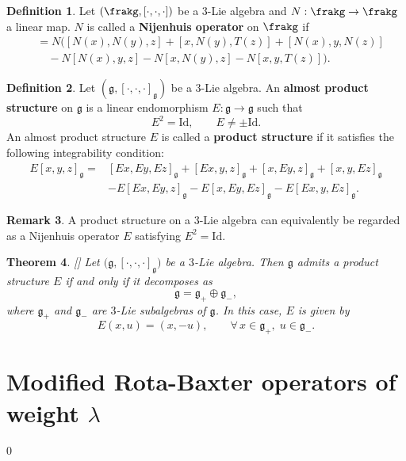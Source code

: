 \documentclass[12pt]{amsart}
\newtheorem{theorem}{Theorem}[section]
\theoremstyle{definition}
\newtheorem{defn}[theorem]{Definition}
\newtheorem{remark}[theorem]{Remark}
\begin{document}
	
	\begin{defn}\cite{L16}
		Let $(\frakg,[\cdot,\cdot,\cdot])$ be a $3$-Lie algebra and
		$N:\frakg\to\frakg$ a linear map.
			$N$ is called a \textbf{Nijenhuis operator} on $\frakg$ if
			\begin{align*}
				[N(x),N(y),N(z)]
				&=N\Big(
				[N(x),N(y),z]+[x,N(y),T(z)]+[N(x),y,N(z)] \\
				&\quad -N[N(x),y,z]-N[x,N(y),z]-N[x,y,T(z)]
				\Big).
			\end{align*}
	\end{defn}
	\begin{defn}\cite{ST18}
		Let $(\mathfrak{g},[\cdot,\cdot,\cdot]_{\mathfrak g})$ be a $3$-Lie algebra.
		An \textbf{almost product structure} on $\mathfrak g$ is a linear endomorphism
		$E:\mathfrak g\to\mathfrak g$ such that
		\[
		E^{2}=\mathrm{Id}, \qquad E\neq \pm \mathrm{Id}.
		\]
		An almost product structure $E$ is called a \textbf{product structure} if it
		satisfies the following integrability condition:
		\begin{align*}
			E[x,y,z]_{\mathfrak g}
			={}&[Ex,Ey,Ez]_{\mathfrak g}
			+[Ex,y,z]_{\mathfrak g}
			+[x,Ey,z]_{\mathfrak g}
			+[x,y,Ez]_{\mathfrak g} \\
			&-E[Ex,Ey,z]_{\mathfrak g}
			-E[x,Ey,Ez]_{\mathfrak g}
			-E[Ex,y,Ez]_{\mathfrak g}.
		\end{align*}
	\end{defn}
	\begin{remark}\label{Remark: Nijenhuis operator and product structure}\cite{ST18}
		A product structure on a $3$-Lie algebra can equivalently be regarded as a
		Nijenhuis operator $E$ satisfying $E^{2}=\mathrm{Id}$.
	\end{remark}
\begin{theorem}\label{Thm: product structure and decomposition}[{\cite[Theorem~5.3]{ST18}}]
	Let $\bigl(\mathfrak{g},[\cdot,\cdot,\cdot]_{\mathfrak g}\bigr)$ be a $3$-Lie algebra.
	Then $\mathfrak g$ admits a product structure $E$ if and only if it decomposes as
	\[
	\mathfrak g=\mathfrak g_{+}\oplus \mathfrak g_{-},
	\]
	where $\mathfrak g_{+}$ and $\mathfrak g_{-}$ are $3$-Lie subalgebras of $\mathfrak g$.
	In this case, $E$ is given by
	\[
	E(x,u)=(x,-u), \qquad \forall\, x\in\mathfrak g_{+},\; u\in\mathfrak g_{-}.
	\]
\end{theorem}





\bigskip
 \section{Modified Rota-Baxter operators of weight $\lambda$}\label{Modified Rota-Baxter operators of weight}
 \def\theequation{\arabic{section}.\arabic{equation}}
\setcounter{equation} {0}
\end{document}
